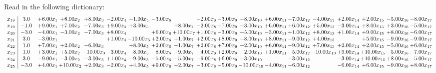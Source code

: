 \documentclass[9pt]{article}
\begin{document}
Read in the following dictionary:
\[\begin{array}{c| c c@{\hskip 2pt} c@{\hskip 2pt} c@{\hskip 2pt} c@{\hskip 2pt} c@{\hskip 2pt} c@{\hskip 2pt} c@{\hskip 2pt} c@{\hskip 2pt} c@{\hskip 2pt} c@{\hskip 2pt} c@{\hskip 2pt} c@{\hskip 2pt} c@{\hskip 2pt} c@{\hskip 2pt} c@{\hskip 2pt} c@{\hskip 2pt} c@{\hskip 2pt} }
 x_{18}   &  3.0 & +  6.00 x_{1} & +  6.00 x_{2} & +  8.00 x_{3} & -2.00 x_{4} & -1.00 x_{5} & -3.00 x_{6} &   & -2.00 x_{8} & -3.00 x_{9} & -8.00 x_{10} & +  6.00 x_{11} & -7.00 x_{12} & -4.00 x_{13} & +  2.00 x_{14} & +  2.00 x_{15} & -5.00 x_{16} & -8.00 x_{17}\\
 x_{19}   &  -1.0 & +  9.00 x_{1} & +  7.00 x_{2} & -7.00 x_{3} & +  9.00 x_{4} & +  3.00 x_{5} &   & +  8.00 x_{7} & -2.00 x_{8} & -7.00 x_{9} & +  3.00 x_{10} & +  6.00 x_{11} & +  6.00 x_{12} & +  5.00 x_{13} & -3.00 x_{14} & +  8.00 x_{15} & +  3.00 x_{16} & -5.00 x_{17}\\
 x_{20}   &  -3.0 & -4.00 x_{1} & -3.00 x_{2} & -7.00 x_{3} & +  8.00 x_{4} &   & +  6.00 x_{6} & + 10.00 x_{7} & +  1.00 x_{8} & -3.00 x_{9} & +  5.00 x_{10} & -3.00 x_{11} & +  1.00 x_{12} & +  8.00 x_{13} & +  1.00 x_{14} & +  9.00 x_{15} & +  8.00 x_{16} & -6.00 x_{17}\\
 x_{21}   &  3.0 & -3.00 x_{1} &    &   & +  1.00 x_{4} & -10.00 x_{5} & +  2.00 x_{6} & +  1.00 x_{7} & +  2.00 x_{8} & +  8.00 x_{9} & -8.00 x_{10} & +  8.00 x_{11} & -9.00 x_{12} & +  4.00 x_{13} &   & +  5.00 x_{15} & -9.00 x_{16} & -9.00 x_{17}\\
 x_{22}   &  1.0 & +  7.00 x_{1} & +  2.00 x_{2} & -6.00 x_{3} &   & +  8.00 x_{5} & +  2.00 x_{6} & -1.00 x_{7} & +  2.00 x_{8} & +  7.00 x_{9} & +  2.00 x_{10} & +  6.00 x_{11} & -9.00 x_{12} & +  7.00 x_{13} & +  2.00 x_{14} & +  2.00 x_{15} & -5.00 x_{16} & +  6.00 x_{17}\\
 x_{23}   &  1.0 & +  3.00 x_{1} & +  5.00 x_{2} & -10.00 x_{3} & -3.00 x_{4} & -8.00 x_{5} & -8.00 x_{6} & +  9.00 x_{7} & -4.00 x_{8} & +  2.00 x_{9} & -2.00 x_{10} & +  1.00 x_{11} & -5.00 x_{12} & -10.00 x_{13} & +  9.00 x_{14} & + 10.00 x_{15} & -5.00 x_{16} & -7.00 x_{17}\\
 x_{24}   &  3.0 & -9.00 x_{1} & -3.00 x_{2} & -3.00 x_{3} & +  1.00 x_{4} & -9.00 x_{5} & -5.00 x_{6} & -5.00 x_{7} & -9.00 x_{8} & +  6.00 x_{9} & +  3.00 x_{10} &   & -3.00 x_{12} &   & -3.00 x_{14} & + 10.00 x_{15} & +  8.00 x_{16} & -5.00 x_{17}\\
 x_{25}   &  -3.0 & +  4.00 x_{1} & + 10.00 x_{2} & +  2.00 x_{3} & -2.00 x_{4} & +  4.00 x_{5} & +  9.00 x_{6} & -2.00 x_{7} & -3.00 x_{8} & -5.00 x_{9} & -10.00 x_{10} & -4.00 x_{11} & -6.00 x_{12} &   & -6.00 x_{14} & +  6.00 x_{15} & -9.00 x_{16} & +  8.00 x_{17}\\

\end{array}\]
\end{document}
